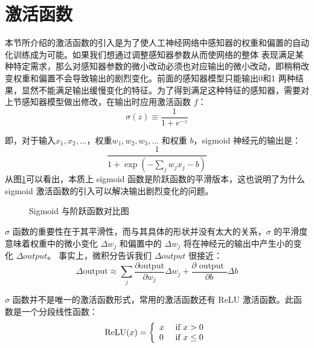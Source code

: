\section{激活函数}
本节所介绍的激活函数的引入是为了使人工神经网络中感知器的权重和偏置的自动化训练成为可能。如果我们想通过调整感知器参数从而使网络的整体
表现满足某种特定需求，那么对感知器参数的微小改动必须也对应输出的微小改动，即稍稍改变权重和偏置不会导致输出的剧烈变化。前面的感知器模型只能输出0和1
两种结果，显然不能满足输出缓慢变化的特征。为了得到满足这种特征的感知器，需要对上节感知器模型做出修改，在输出时应用激活函数 $f$：
\begin{equation}
	\label{eqn:sigmoid}
	\sigma ( z ) \equiv \frac { 1 } { 1 + e ^ { - z } }
\end{equation}

即，对于输入$x_1, x_2, ...$，权重$w_1, w_2, w_3,...$ 和权重 $b$，sigmoid 神经元的输出是：
\begin{equation}
	\label{eqn:sigmoidoutput}
	\frac { 1 } { 1 + \exp \left( - \sum _ { j } w _ { j } x _ { j } - b \right) }
\end{equation}
从图\ref{sigmoid_step}可以看出，本质上 sigmoid 函数是阶跃函数的平滑版本，这也说明了为什么 sigmoid 激活函数的引入可以解决输出剧烈变化的问题。

\begin{figure}[htbp]
	\caption{Sigmoid 与阶跃函数对比图}
	\label{sigmoid_step}
\end{figure}

$\sigma$ 函数的重要性在于其平滑性，而与其具体的形状并没有太大的关系，$\sigma$ 的平滑度意味着权重中的微小变化
$\Delta w_j$ 和偏置中的 $\Delta w_j$ 将在神经元的输出中产生小的变化 $\Delta output$。
 事实上，微积分告诉我们 $\Delta output$ 很接近：
\begin{equation}
	\label{eqn:sigmoiddelta}
	\Delta \mathrm { output } \approx \sum _ { j } \frac { \partial \mathrm { output } } { \partial w _ { j } } \Delta w _ { j } + \frac { \partial \text { output } } { \partial b } \Delta b
\end{equation}

$\sigma$ 函数并不是唯一的激活函数形式，常用的激活函数还有 ReLU 激活函数。此函数是一个分段线性函数：
\begin{equation}
	\label{eqn:relu}
	\operatorname { ReLU } ( x ) = \left\{ \begin{array} { l l } { x } & { \text { if } x > 0 } \\ { 0 } & { \text { if } x \leq 0 } \end{array} \right.
\end{equation}

